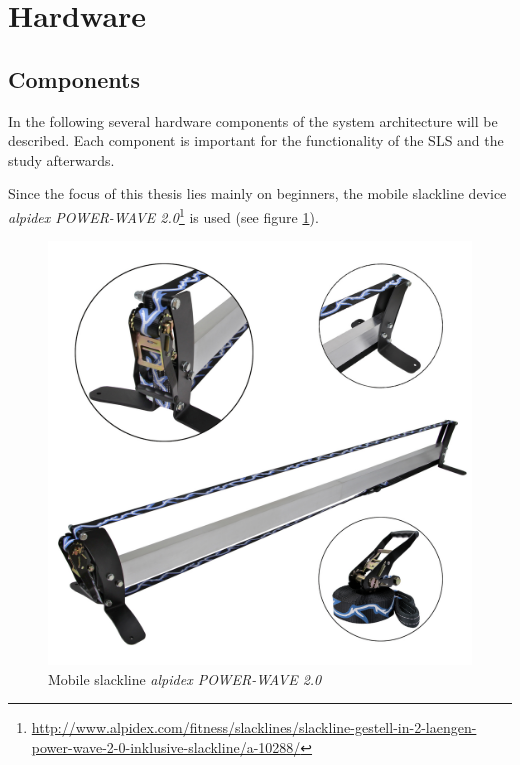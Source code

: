 \section{Hardware}\label{5_1_systemSetup}
\subsection{Components}\label{5_1_hardwareComponents}
In the following several hardware components of the system architecture will be described. Each component is important for the functionality of the SLS and the study afterwards.

Since the focus of this thesis lies mainly on beginners, the mobile slackline device \textit{alpidex POWER-WAVE 2.0}\footnote{\url{http://www.alpidex.com/fitness/slacklines/slackline-gestell-in-2-laengen-power-wave-2-0-inklusive-slackline/a-10288/}} is used (see figure \ref{fig:5_1_mobileSlackline}).

\begin{figure}[htb]
	\centering
	\begin{minipage}[t]{1\linewidth}
		\centering
		\includegraphics[width=0.4\linewidth]{Pictures/5_1_mobileSlackline}
		\caption{Mobile slackline \textit{alpidex POWER-WAVE 2.0}~\cite{alpidex2017-ms}}
		\label{fig:5_1_mobileSlackline}
	\end{minipage}
\end{figure}

